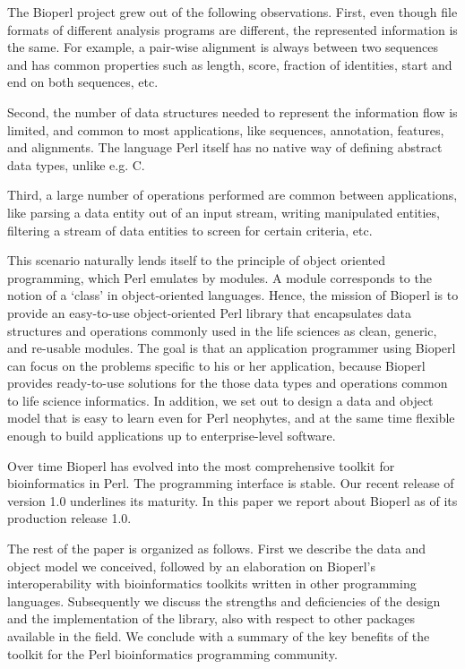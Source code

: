 \documentclass[twocolumn]{article}
\begin{document}
The Bioperl project grew out of the following observations.  First,
even though file formats of different analysis programs are different,
the represented information is the same.  For example, a pair-wise alignment
is always between two sequences and has common properties such as
length, score, fraction of identities, start and end on both sequences, etc. 

Second, the number of data structures needed to represent the
information flow is limited, and common to most applications, like
sequences, annotation, features, and alignments.  The language Perl
itself has no native way of defining abstract data types, unlike
e.g. C.

Third, a large number of operations performed are common between
applications, like parsing a data entity out of an input stream,
writing manipulated entities, filtering a stream of data entities to
screen for certain criteria, etc. 

This scenario naturally lends itself to the principle of object
oriented programming, which Perl emulates by modules.  A module
corresponds to the notion of a `class' in object-oriented languages.
Hence, the mission of Bioperl is to provide an easy-to-use
object-oriented Perl library that encapsulates data structures and
operations commonly used in the life sciences as clean, generic, and
re-usable modules.  The goal is that an application programmer using
Bioperl can focus on the problems specific to his or her application,
because Bioperl provides ready-to-use solutions for the those data
types and operations common to life science informatics.  In addition,
we set out to design a data and object model that is easy to learn
even for Perl neophytes, and at the same time flexible enough to build
applications up to enterprise-level software.

Over time Bioperl has evolved into the most comprehensive toolkit for
bioinformatics in Perl.  The programming interface is stable.  Our
recent release of version 1.0 underlines its maturity.  In this paper
we report about Bioperl as of its production release 1.0.

The rest of the paper is organized as follows.  First we describe the
data and object model we conceived, followed by an elaboration on
Bioperl's interoperability with bioinformatics toolkits written in
other programming languages.  Subsequently we discuss the strengths and
deficiencies of the design and the implementation of the library, also
with respect to other packages available in the field.  We conclude
with a summary of the key benefits of the toolkit for the Perl
bioinformatics programming community.
\end{document}
